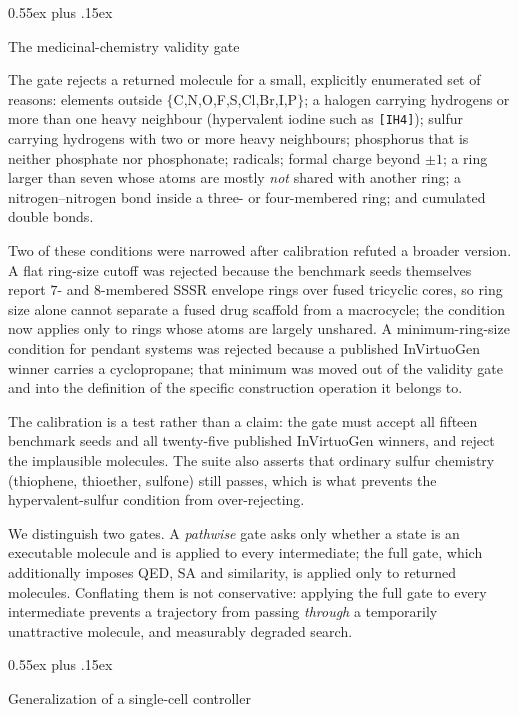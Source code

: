 \documentclass{article}
\makeatletter
\theoremstyle{definition}
\theoremstyle{remark}
\def\subsection{\@startsection{subsection}{2}{\z@}{-1.2ex plus -0.4ex minus -.2ex}%
  {0.55ex plus .15ex}{\normalsize\sc\raggedright}}
\makeatother
\begin{document}
\subsection{The medicinal-chemistry validity gate}
\label{app:medchem-gate}

The gate rejects a returned molecule for a small, explicitly enumerated set of
reasons: elements outside $\{$C,N,O,F,S,Cl,Br,I,P$\}$; a halogen carrying
hydrogens or more than one heavy neighbour (hypervalent iodine such as
\texttt{[IH4]}); sulfur carrying hydrogens with two or more heavy neighbours;
phosphorus that is neither phosphate nor phosphonate; radicals; formal charge
beyond $\pm1$; a ring larger than seven whose atoms are mostly \emph{not}
shared with another ring; a nitrogen--nitrogen bond inside a three- or
four-membered ring; and cumulated double bonds.

Two of these conditions were narrowed after calibration refuted a broader
version. A flat ring-size cutoff was rejected because the benchmark seeds
themselves report $7$- and $8$-membered SSSR envelope rings over fused
tricyclic cores, so ring size alone cannot separate a fused drug scaffold from
a macrocycle; the condition now applies only to rings whose atoms are largely
unshared. A minimum-ring-size condition for pendant systems was rejected
because a published InVirtuoGen winner carries a cyclopropane; that minimum was
moved out of the validity gate and into the definition of the specific
construction operation it belongs to.

The calibration is a test rather than a claim: the gate must accept all fifteen
benchmark seeds and all twenty-five published InVirtuoGen winners, and reject
the implausible molecules. The suite also asserts that ordinary sulfur
chemistry (thiophene, thioether, sulfone) still passes, which is what prevents
the hypervalent-sulfur condition from over-rejecting.

We distinguish two gates. A \emph{pathwise} gate asks only whether a state is an
executable molecule and is applied to every intermediate; the full gate, which
additionally imposes QED, SA and similarity, is applied only to returned
molecules. Conflating them is not conservative: applying the full gate to every
intermediate prevents a trajectory from passing \emph{through} a temporarily
unattractive molecule, and measurably degraded search.

\subsection{Generalization of a single-cell controller}
\label{app:t4-generalization}
\end{document}

